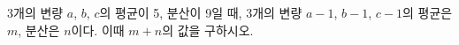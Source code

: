3개의 변량 $a$, $b$, $c$의 평균이 5, 분산이 9일 때, 3개의 변량 $a-1$, $b-1$, $c-1$의 평균은 $m$, 분산은 $n$이다. 이때 $m+n$의 값을 구하시오.
